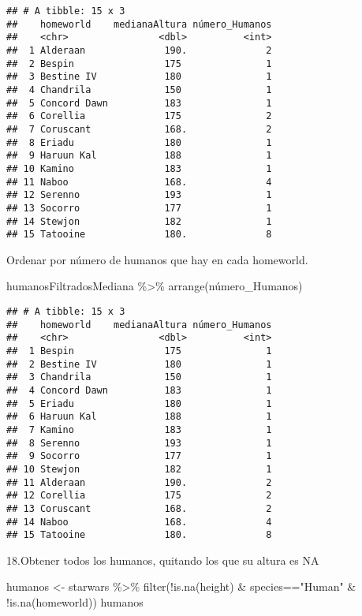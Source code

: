 \documentclass[
]{book}
\newenvironment{Shaded}{\begin{snugshade}}{\end{snugshade}}
\newcommand{\FunctionTok}[1]{\textcolor[rgb]{0.00,0.00,0.00}{#1}}
\newcommand{\NormalTok}[1]{#1}
\newcommand{\OtherTok}[1]{\textcolor[rgb]{0.56,0.35,0.01}{#1}}
\newcommand{\SpecialCharTok}[1]{\textcolor[rgb]{0.00,0.00,0.00}{#1}}
\newcommand{\StringTok}[1]{\textcolor[rgb]{0.31,0.60,0.02}{#1}}
\begin{document}
\begin{verbatim}
## # A tibble: 15 x 3
##    homeworld    medianaAltura número_Humanos
##    <chr>                <dbl>          <int>
##  1 Alderaan              190.              2
##  2 Bespin                175               1
##  3 Bestine IV            180               1
##  4 Chandrila             150               1
##  5 Concord Dawn          183               1
##  6 Corellia              175               2
##  7 Coruscant             168.              2
##  8 Eriadu                180               1
##  9 Haruun Kal            188               1
## 10 Kamino                183               1
## 11 Naboo                 168.              4
## 12 Serenno               193               1
## 13 Socorro               177               1
## 14 Stewjon               182               1
## 15 Tatooine              180.              8
\end{verbatim}

Ordenar por número de humanos que hay en cada homeworld.

\begin{Shaded}
\begin{Highlighting}[]
\NormalTok{humanosFiltradosMediana }\SpecialCharTok{\%\textgreater{}\%} \FunctionTok{arrange}\NormalTok{(número\_Humanos)}
\end{Highlighting}
\end{Shaded}

\begin{verbatim}
## # A tibble: 15 x 3
##    homeworld    medianaAltura número_Humanos
##    <chr>                <dbl>          <int>
##  1 Bespin                175               1
##  2 Bestine IV            180               1
##  3 Chandrila             150               1
##  4 Concord Dawn          183               1
##  5 Eriadu                180               1
##  6 Haruun Kal            188               1
##  7 Kamino                183               1
##  8 Serenno               193               1
##  9 Socorro               177               1
## 10 Stewjon               182               1
## 11 Alderaan              190.              2
## 12 Corellia              175               2
## 13 Coruscant             168.              2
## 14 Naboo                 168.              4
## 15 Tatooine              180.              8
\end{verbatim}

18.Obtener todos los humanos, quitando los que su altura es NA

\begin{Shaded}
\begin{Highlighting}[]
\NormalTok{humanos }\OtherTok{\textless{}{-}}\NormalTok{ starwars }\SpecialCharTok{\%\textgreater{}\%} \FunctionTok{filter}\NormalTok{(}\SpecialCharTok{!}\FunctionTok{is.na}\NormalTok{(height) }\SpecialCharTok{\&}\NormalTok{ species}\SpecialCharTok{==}\StringTok{"Human"} \SpecialCharTok{\&} \SpecialCharTok{!}\FunctionTok{is.na}\NormalTok{(homeworld))}
\NormalTok{humanos}
\end{Highlighting}
\end{Shaded}
\end{document}
